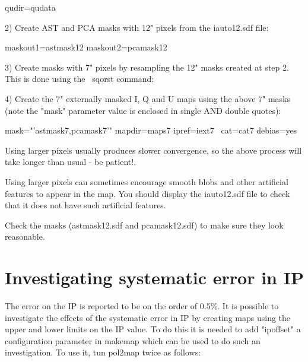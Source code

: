 \begin{terminalv}
                    qudir=qudata
\end{terminalv}


2) Create AST and PCA masks with 12" pixels from the iauto12.sdf file:


\begin{terminalv}
                   maskout1=astmask12 maskout2=pcamask12
\end{terminalv}

3) Create masks with 7" pixels by resampling the 12" masks created at
step 2. This is done using the \Kappa\ sqorst command:

\begin{terminalv}
\end{terminalv}

4) Create the 7" externally masked I, Q and U maps using the above 7"
masks (note the "mask" parameter value  is enclosed in single AND
double quotes):

\begin{terminalv}
                  mask="'astmask7,pcamask7'" mapdir=maps7 ipref=iext7  \
                  cat=cat7 debias=yes
\end{terminalv}


\begin{tip}
Using larger pixels usually produces slower convergence, so the
above process will take longer than usual - be patient!.

Using larger pixels can sometimes encourage smooth blobs and other
artificial features to appear in the map. You should display the
iauto12.sdf file to check that it does not have such artificial
features.

Check the masks (astmask12.sdf and pcamask12.sdf) to make sure
they look reasonable.
\end{tip}

\section{Investigating systematic error in IP}


The error on the IP is reported to be on the order of 0.5\%.
It is possible to investigate the effects of the systematic
error in IP by creating maps using the upper and lower limits on the
IP value. To do this it is needed to add "ipoffset" a configuration 
parameter in makemap which can be used to do such an investigation. To
use it, tun pol2map twice as follows:

